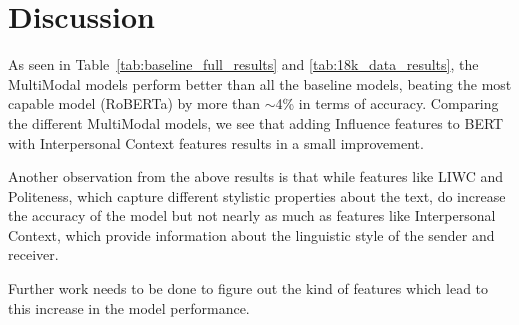 \section{Discussion}

As seen in Table~\ref{tab:baseline_full_results} and \ref{tab:18k_data_results}, the MultiModal models perform better than all the baseline models, beating the most capable model (RoBERTa) by more than $\sim$4\% in terms of accuracy. Comparing the different MultiModal models, we see that adding Influence features to BERT with Interpersonal Context features results in a small improvement. 

Another observation from the above results is that while features like LIWC and Politeness, which capture different stylistic properties about the text, do increase the accuracy of the model but not nearly as much as features like Interpersonal Context, which provide information about the linguistic style of the sender and receiver.  

Further work needs to be done to figure out the kind of features which lead to this increase in the model performance.